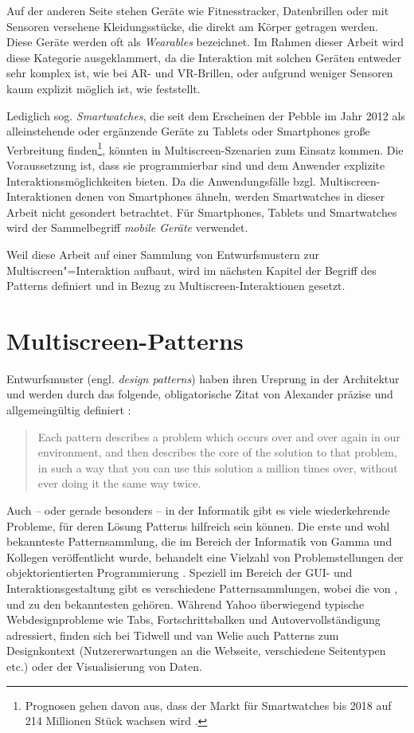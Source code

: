 Auf der anderen Seite stehen Geräte wie Fitnesstracker, Datenbrillen oder mit Sensoren versehene Kleidungsstücke, die direkt am Körper getragen werden. Diese Geräte werden oft als \textit{Wearables} bezeichnet. Im Rahmen dieser Arbeit wird diese Kategorie ausgeklammert, da die Interaktion mit solchen Geräten entweder sehr komplex ist, wie \zb bei \ac{AR}- und \ac{VR}-Brillen, oder aufgrund weniger Sensoren kaum explizit möglich ist, wie \zb \cite{Yoon2014} feststellt.

Lediglich sog. \textit{Smartwatches}, die seit dem Erscheinen der Pebble im Jahr 2012 als alleinstehende oder ergänzende Geräte zu Tablets oder Smartphones große Verbreitung finden\footnote{Prognosen gehen davon aus, dass der Markt für Smartwatches bis 2018 auf 214 Millionen Stück wachsen wird \citep{Rawassizadeh2014}.}, könnten in Multiscreen-Szenarien zum Einsatz kommen. Die Voraussetzung ist, dass sie programmierbar sind und dem Anwender explizite Interaktionsmöglichkeiten bieten. Da die Anwendungsfälle bzgl. Multiscreen-Interaktionen denen von Smartphones ähneln, werden Smartwatches in dieser Arbeit nicht gesondert betrachtet. Für Smartphones, Tablets und Smartwatches wird der Sammelbegriff \textit{mobile Geräte} verwendet.

Weil diese Arbeit auf einer Sammlung von Entwurfsmustern zur Multiscreen"=Interaktion aufbaut, wird im nächsten Kapitel der Begriff des Patterns definiert und in Bezug zu Multiscreen-Interaktionen gesetzt.

\section{Multiscreen-Patterns}
\label{sec:msp-patterns}
Entwurfsmuster (engl. \textit{design patterns}) haben ihren Ursprung in der Architektur und werden durch das folgende, obligatorische Zitat von Alexander präzise und allgemeingültig definiert \citep{Alexander1977}: 
\begin{quote}
Each pattern describes a problem which occurs over and over again in our environment, and then describes the core of the solution to that problem, in such a way that you can use this solution a million times over, without ever doing it the same way twice.
\end{quote}
Auch -- oder gerade besonders -- in der Informatik gibt es viele wiederkehrende Probleme, für deren Lösung Patterns hilfreich sein können. Die erste und wohl bekannteste Patternsammlung, die im Bereich der Informatik von Gamma und Kollegen veröffentlicht wurde, behandelt eine Vielzahl von Problemstellungen der objektorientierten Programmierung \citep{Gamma1995}.
Speziell im Bereich der GUI- und Interaktionsgestaltung gibt es verschiedene Patternsammlungen, wobei die von \cite{Yahoo2015}, \cite{Tidwell2010} und \cite{Welie2008} zu den bekanntesten gehören. Während Yahoo überwiegend typische Webdesignprobleme wie Tabs, Fortschrittsbalken und Autovervollständigung adressiert, finden sich bei Tidwell und van Welie \zb auch Patterns zum Designkontext (Nutzererwartungen an die Webseite, verschiedene Seitentypen etc.) oder der Visualisierung von Daten.

